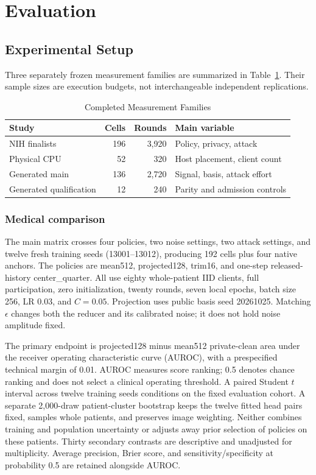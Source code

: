 \documentclass[conference,letterpaper]{IEEEtran}
\begin{document}
\section{Evaluation}
\subsection{Experimental Setup}
Three separately frozen measurement families are summarized in Table~\ref{tab:design}. Their sample sizes are execution budgets, not interchangeable independent replications.

\begin{table}[t]
\caption{Completed Measurement Families}
\label{tab:design}
\centering\footnotesize
\begin{tabular}{@{}p{1.02in}rrp{1.0in}@{}}
\toprule
Study & Cells & Rounds & Main variable\\\midrule
NIH finalists &196&3,920&Policy, privacy, attack\\
Physical CPU &52&320&Host placement, client count\\
Generated main &136&2,720&Signal, basis, attack effort\\
Generated qualification &12&240&Parity and admission controls\\
\bottomrule
\end{tabular}
\end{table}

\subsubsection{Medical comparison}
The main matrix crosses four policies, two noise settings, two attack settings, and twelve fresh training seeds (13001--13012), producing 192 cells plus four native anchors. The policies are mean512, projected128, trim16, and one-step released-history center\_quarter. All use eighty whole-patient IID clients, full participation, zero initialization, twenty rounds, seven local epochs, batch size 256, LR 0.03, and $C=0.05$. Projection uses public basis seed 20261025. Matching $\epsilon$ changes both the reducer and its calibrated noise; it does not hold noise amplitude fixed.

The primary endpoint is projected128 minus mean512 private-clean area under the receiver operating characteristic curve (AUROC), with a prespecified technical margin of 0.01. AUROC measures score ranking; 0.5 denotes chance ranking and does not select a clinical operating threshold. A paired Student $t$ interval across twelve training seeds conditions on the fixed evaluation cohort. A separate 2,000-draw patient-cluster bootstrap keeps the twelve fitted head pairs fixed, samples whole patients, and preserves image weighting. Neither combines training and population uncertainty or adjusts away prior selection of policies on these patients. Thirty secondary contrasts are descriptive and unadjusted for multiplicity. Average precision, Brier score, and sensitivity/specificity at probability 0.5 are retained alongside AUROC.
\end{document}

